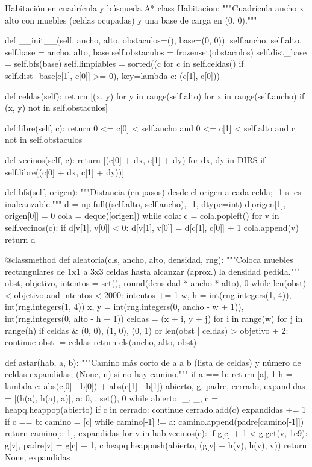 \documentclass[11pt,letterpaper]{article}
\begin{document}
\begin{codigo}[label=cod:entorno]{Habitación en cuadrícula y búsqueda A*}
class Habitacion:
    """Cuadrícula ancho x alto con muebles (celdas ocupadas) y una base de carga en (0, 0)."""

    def __init__(self, ancho, alto, obstaculos=(), base=(0, 0)):
        self.ancho, self.alto, self.base = ancho, alto, base
        self.obstaculos = frozenset(obstaculos)
        self.dist_base = self.bfs(base)
        self.limpiables = sorted((c for c in self.celdas() if self.dist_base[c[1], c[0]] >= 0), key=lambda c: (c[1], c[0]))

    def celdas(self):
        return [(x, y) for y in range(self.alto) for x in range(self.ancho) if (x, y) not in self.obstaculos]

    def libre(self, c):
        return 0 <= c[0] < self.ancho and 0 <= c[1] < self.alto and c not in self.obstaculos

    def vecinos(self, c):
        return [(c[0] + dx, c[1] + dy) for dx, dy in DIRS if self.libre((c[0] + dx, c[1] + dy))]

    def bfs(self, origen):
        """Distancia (en pasos) desde el origen a cada celda; -1 si es inalcanzable."""
        d = np.full((self.alto, self.ancho), -1, dtype=int)
        d[origen[1], origen[0]] = 0
        cola = deque([origen])
        while cola:
            c = cola.popleft()
            for v in self.vecinos(c):
                if d[v[1], v[0]] < 0:
                    d[v[1], v[0]] = d[c[1], c[0]] + 1
                    cola.append(v)
        return d

    @classmethod
    def aleatoria(cls, ancho, alto, densidad, rng):
        """Coloca muebles rectangulares de 1x1 a 3x3 celdas hasta alcanzar (aprox.) la densidad pedida."""
        obst, objetivo, intentos = set(), round(densidad * ancho * alto), 0
        while len(obst) < objetivo and intentos < 2000:
            intentos += 1
            w, h = int(rng.integers(1, 4)), int(rng.integers(1, 4))
            x, y = int(rng.integers(0, ancho - w + 1)), int(rng.integers(0, alto - h + 1))
            celdas = {(x + i, y + j) for i in range(w) for j in range(h)}
            if celdas & {(0, 0), (1, 0), (0, 1)} or len(obst | celdas) > objetivo + 2:
                continue
            obst |= celdas
        return cls(ancho, alto, obst)


def astar(hab, a, b):
    """Camino más corto de a a b (lista de celdas) y número de celdas expandidas; (None, n) si no hay camino."""
    if a == b:
        return [a], 1
    h = lambda c: abs(c[0] - b[0]) + abs(c[1] - b[1])
    abierto, g, padre, cerrado, expandidas = [(h(a), h(a), a)], {a: 0}, {}, set(), 0
    while abierto:
        _, _, c = heapq.heappop(abierto)
        if c in cerrado:
            continue
        cerrado.add(c)
        expandidas += 1
        if c == b:
            camino = [c]
            while camino[-1] != a:
                camino.append(padre[camino[-1]])
            return camino[::-1], expandidas
        for v in hab.vecinos(c):
            if g[c] + 1 < g.get(v, 1e9):
                g[v], padre[v] = g[c] + 1, c
                heapq.heappush(abierto, (g[v] + h(v), h(v), v))
    return None, expandidas
\end{codigo}
\end{document}
